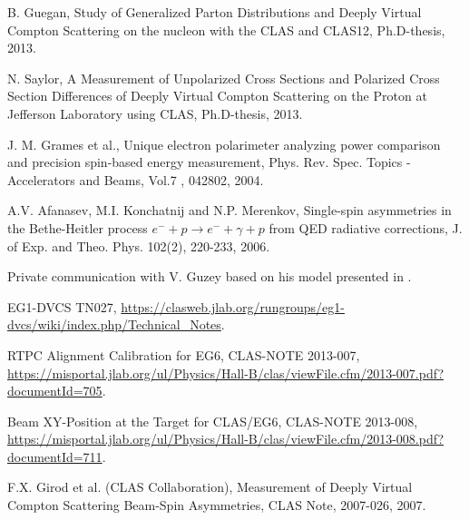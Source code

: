 \begin{thebibliography}{99}
B. Guegan, Study of Generalized Parton Distributions and Deeply Virtual Compton Scattering on the nucleon with the CLAS and CLAS12, Ph.D-thesis, 2013.

N. Saylor, A Measurement of Unpolarized Cross Sections and Polarized Cross Section Differences of Deeply Virtual Compton Scattering on the Proton at Jefferson Laboratory using CLAS, Ph.D-thesis, 2013.


J. M. Grames et al., Unique electron polarimeter analyzing power comparison and precision spin-based energy measurement, Phys. Rev. Spec. Topics - Accelerators and Beams, Vol.7 , 042802, 2004.

A.V. Afanasev, M.I. Konchatnij and N.P. Merenkov, Single-spin asymmetries in the Bethe-Heitler process $e^{-} + p \rightarrow  e^{-} + \gamma + p$ from QED radiative corrections, J. of Exp. and Theo. Phys. 102(2), 220-233, 2006.

Private communication with V. Guzey based on his model presented in \cite{EMC_vadim_3}. 


EG1-DVCS TN027, \url{https://clasweb.jlab.org/rungroups/eg1-dvcs/wiki/index.php/Technical_Notes}.

RTPC Alignment Calibration for EG6, CLAS-NOTE 2013-007, \url{https://misportal.jlab.org/ul/Physics/Hall-B/clas/viewFile.cfm/2013-007.pdf?documentId=705}.

Beam XY-Position at the Target for CLAS/EG6, CLAS-NOTE 2013-008, \url{https://misportal.jlab.org/ul/Physics/Hall-B/clas/viewFile.cfm/2013-008.pdf?documentId=711}.


F.X. Girod et al. (CLAS Collaboration), Measurement of Deeply Virtual Compton Scattering Beam-Spin Asymmetries, CLAS Note, 2007-026, 2007.


\end{thebibliography}
